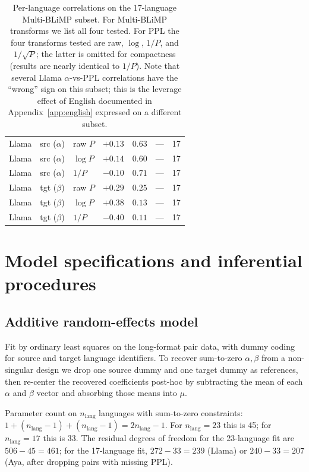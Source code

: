 \documentclass[11pt]{article}
\begin{document}
\begin{table}[h]
\begin{tabular}{lllrrrr}
Llama & src ($\alpha$) & raw $P$     & $+0.13$ & $0.63$  & --- & 17 \\
Llama & src ($\alpha$) & $\log P$    & $+0.14$ & $0.60$  & --- & 17 \\
Llama & src ($\alpha$) & $1/P$       & $-0.10$ & $0.71$  & --- & 17 \\
Llama & tgt ($\beta$)  & raw $P$     & $+0.29$ & $0.25$  & --- & 17 \\
Llama & tgt ($\beta$)  & $\log P$    & $+0.38$ & $0.13$  & --- & 17 \\
Llama & tgt ($\beta$)  & $1/P$       & $-0.40$ & $0.11$  & --- & 17 \\
\bottomrule
\end{tabular}
\caption{Per-language correlations on the 17-language Multi-BLiMP
subset. For Multi-BLiMP transforms we list all four tested. For PPL
the four transforms tested are raw, $\log$, $1/P$, and $1/\sqrt{P}$;
the latter is omitted for compactness (results are nearly identical to
$1/P$). Note that several Llama $\alpha$-vs-PPL correlations have the
``wrong'' sign on this subset; this is the leverage effect of English
documented in Appendix~\ref{app:english} expressed on a different
subset.}
\label{tab:app-corr}
\end{table}

\section{Model specifications and inferential procedures}
\label{app:methods}

\subsection{Additive random-effects model}

Fit by ordinary least squares on the long-format pair data, with
dummy coding for source and target language identifiers. To recover
sum-to-zero $\alpha, \beta$ from a non-singular design we drop one
source dummy and one target dummy as references, then re-center the
recovered coefficients post-hoc by subtracting the mean of each
$\alpha$ and $\beta$ vector and absorbing those means into $\mu$.

Parameter count on $n_{\text{lang}}$ languages with sum-to-zero
constraints: $1 + (n_{\text{lang}} - 1) + (n_{\text{lang}} - 1) =
2 n_{\text{lang}} - 1$. For $n_{\text{lang}} = 23$ this is 45; for
$n_{\text{lang}} = 17$ this is 33. The residual degrees of freedom
for the 23-language fit are $506 - 45 = 461$; for the 17-language
fit, $272 - 33 = 239$ (Llama) or $240 - 33 = 207$ (Aya, after dropping
pairs with missing PPL).
\end{document}
